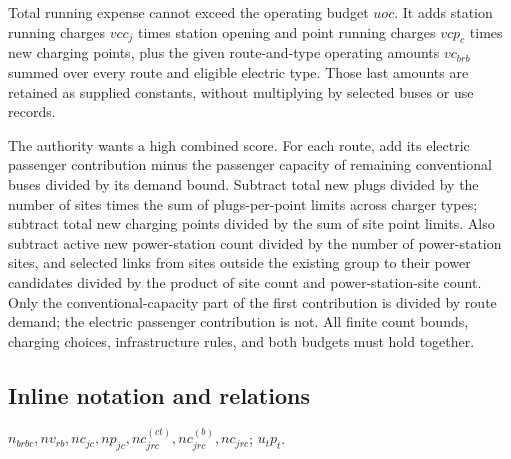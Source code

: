 \documentclass[10pt]{article}
\begin{document}
Total running expense cannot exceed the operating budget $uoc$. It adds station running charges $vcc_j$ times station opening and point running charges $vcp_c$ times new charging points, plus the given route-and-type operating amounts $vc_{brb}$ summed over every route and eligible electric type. Those last amounts are retained as supplied constants, without multiplying by selected buses or use records.

The authority wants a high combined score. For each route, add its electric passenger contribution minus the passenger capacity of remaining conventional buses divided by its demand bound. Subtract total new plugs divided by the number of sites times the sum of plugs-per-point limits across charger types; subtract total new charging points divided by the sum of site point limits. Also subtract active new power-station count divided by the number of power-station sites, and selected links from sites outside the existing group to their power candidates divided by the product of site count and power-station-site count. Only the conventional-capacity part of the first contribution is divided by route demand; the electric passenger contribution is not. All finite count bounds, charging choices, infrastructure rules, and both budgets must hold together.

\subsection*{Inline notation and relations}
$n_{brbc},nv_{rb},nc_{jc},np_{jc},nc^{(ct)}_{jrc},nc^{(b)}_{jrc},nc_{jrc}$; $u_tp_t$.
\end{document}
